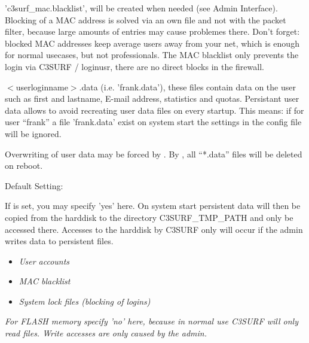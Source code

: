 \begin{itemize}
\begin{description}
\newpage

  'c3surf\_mac.blacklist', will be created when needed (see Admin
  Interface). Blocking of a MAC address is solved via an own file
  and not with the packet filter, because large amounts of entries may
  cause problemes there. Don't forget: blocked MAC addresses keep
  average users away from your net, which is enough for normal usecases,
  but not professionals. The MAC blacklist only prevents the login via
  C3SURF / loginusr, there are no direct blocks in the firewall.


  $<$userloginname$>$.data (i.e. 'frank.data'), these files contain data on the
  user such as first and lastname, E-mail address, statistics and quotas. Persistant
  user data allows to avoid recreating user data files on every startup.
  This means: if for user ``frank'' a file 'frank.data' exist on system start
  the settings in the config file will be ignored.
\parskip 12pt

  Overwriting of user data may be forced by .
  By ,
  all ``*.data'' files will be deleted on reboot.


  Default Setting: 

  If 
  is set, you may specify 'yes' here. On system start persistent data will
  then be copied from the harddisk to the directory C3SURF\_TMP\_PATH
  and only be accessed there. Accesses to the harddisk by C3SURF only will
  occur if the admin writes data to persistent files.

  \begin{itemize}
  \item \emph{User accounts}
  \item \emph{MAC blacklist}
  \item \emph{System lock files (blocking of logins)}\\
  \end{itemize}

  \emph{For FLASH memory specify 'no' here, because in normal use C3SURF will
  only read files. Write accesses are only caused by the admin.}


\end{description}
\end{itemize}
